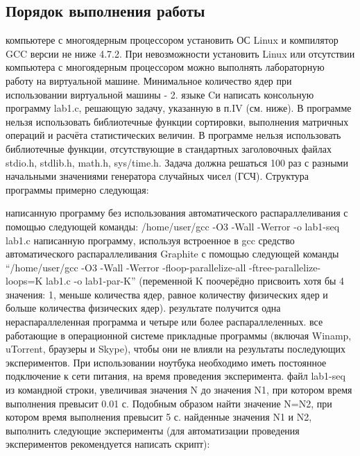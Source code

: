 { %
	\subsection{Порядок выполнения работы}
	\begin{enumerate}
		 компьютере с многоядерным процессором установить ОС Linux и компилятор GCC версии не ниже 4.7.2. При невозможности установить Linux или отсутствии компьютера с многоядерным процессором можно выполнять лабораторную работу на виртуальной машине. Минимальное количество ядер при использовании виртуальной машины - 2.
		 языке Cи написать консольную программу lab1.c, решающую задачу, указанную в п.IV (см. ниже). В программе нельзя использовать библиотечные функции сортировки, выполнения матричных операций и расчёта статистических величин.  В программе
нельзя использовать библиотечные функции, отсутствующие в стандартных заголовочных файлах stdio.h, stdlib.h, math.h, sys/time.h. Задача должна решаться 100 раз с разными начальными значениями генератора случайных чисел (ГСЧ).  Структура программы примерно следующая:
			\begin{figure}[H]
				
			\end{figure}
		 написанную программу без использования автоматического распараллеливания с помощью следующей команды: /home/user/gcc -O3 -Wall -Werror -o lab1-seq lab1.c
		 написанную программу, используя встроенное в gcc средство автоматического распараллеливания Graphite с помощью следующей команды “/home/user/gcc -O3 -Wall -Werror -floop-parallelize-all -ftree-parallelize-loops=K lab1.c -o lab1-par-K” (переменной K поочерёдно присвоить хотя бы 4 значения: 1, меньше количества ядер, равное количеству физических ядер и больше количества физических ядер).
		 результате получится одна нераспараллеленная программа и четыре или более распараллеленных.
		 все работающие в операционной системе прикладные программы (включая Winamp, uTorrent, браузеры и Skype), чтобы они не влияли на результаты последующих экспериментов. При использовании ноутбука необходимо иметь постоянное подключение к сети питания, на время проведения эксперимента.
		 файл lab1-seq из командной строки, увеличивая значения N до значения N1, при котором время выполнения превысит 0.01 с. Подобным образом найти значение N=N2, при котором время выполнения превысит 5 с.
		 найденные значения N1 и N2, выполнить следующие эксперименты (для автоматизации проведения экспериментов рекомендуется написать скрипт):

\end{enumerate}}
